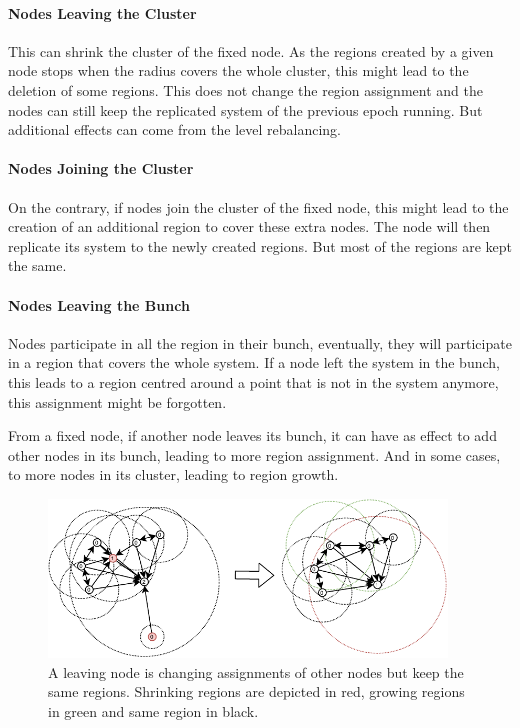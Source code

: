 \documentclass[a4paper,11pt,oneside]{report}
\begin{document}
\paragraph{Nodes Leaving the Cluster} This can shrink the cluster of the fixed
node. As the regions created by a given node stops when the radius covers the
whole cluster, this might lead to the deletion of some regions. This does not
change the region assignment and the nodes can still keep the replicated system
of the previous epoch running. But additional effects can come from the level
rebalancing. 

\paragraph{Nodes Joining the Cluster} On the contrary, if nodes join the
cluster of the fixed node, this might lead to the creation of an additional
region to cover these extra nodes. The node will then replicate its system to
the newly created regions. But most of the regions are kept the same.

\paragraph{Nodes Leaving the Bunch} Nodes participate in all the region in
their bunch, eventually, they will participate in a region that covers the
whole system. If a node left the system in the bunch, this leads to a region
centred around a point that is not in the system anymore, this assignment might
be forgotten. 

From a fixed node, if another node leaves its bunch, it can have as effect to
add other nodes in its bunch, leading to more region assignment.  And in some
cases, to more nodes in its cluster, leading to region growth. 

\begin{figure}[!h] \centering
    \includegraphics[width=300pt]{figures/LocarnoTreaties-Leaving-cluster}
    \caption{A leaving node is changing assignments of other nodes but keep the
    same regions. Shrinking regions are depicted in red, growing regions in
    green and same region in black. }
\label{fig:LocarnoTreaties-Leaving-cluster} \end{figure}
\end{document}
